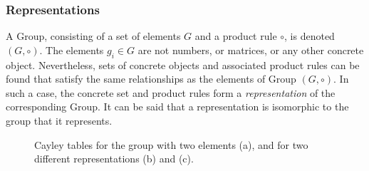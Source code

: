 \subsubsection{Representations}\label{sec:representations}
A Group, consisting of a set of elements $G$ and a product rule $\circ$, is denoted $(G,\circ)$. 
The elements $g_i\in G$ are not numbers, or matrices, or any other concrete object.
Nevertheless, sets of concrete objects and associated product rules can be found that satisfy the same relationships as the elements of Group $(G,\circ)$.
In such a case, the concrete set and product rules form a \emph{representation} of the corresponding Group.
It can be said that a representation is isomorphic to the group that it represents.

\begin{figure}[h!]
\captionsetup[subfigure]{position=b}
\centering
{}
\caption{Cayley tables for the group with two elements (a), and for two different representations (b) and (c).}
\label{tab:representations}
\end{figure}

